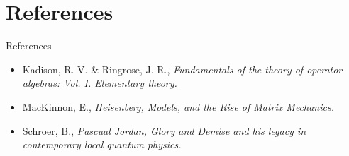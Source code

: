 \documentclass{beamer}
\begin{document}
\appendix{}
\section{References}
\begin{frame}{References}{}
\begin{itemize}
\item{}
	Kadison, R. V. \& Ringrose, J. R.,
	\emph{Fundamentals of the theory of operator algebras: Vol. I. Elementary theory.}
	
\item{}
	MacKinnon, E.,
	\emph{Heisenberg, Models, and the Rise of Matrix Mechanics.}

\item{}
	Schroer, B.,
	\emph{Pascual Jordan, Glory and Demise and his legacy in contemporary local quantum physics.}
\end{itemize}
\end{frame}
\end{document}
